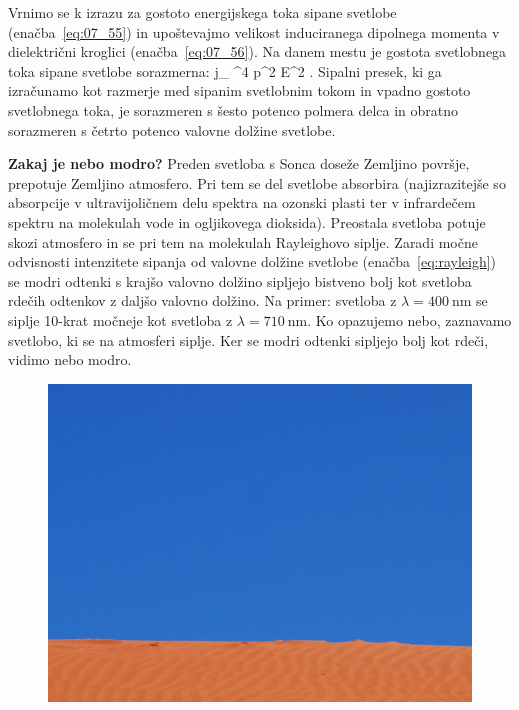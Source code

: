 Vrnimo se k izrazu za gostoto energijskega toka sipane 
svetlobe (enačba~\ref{eq:07_55}) in upoštevajmo velikost induciranega 
dipolnega momenta v dielektrični kroglici (enačba~\ref{eq:07_56}). Na danem
mestu je gostota svetlobnega toka sipane svetlobe sorazmerna:
\beq
j_ \propto \omega^4 p^2 \propto E^2 .
\label{eq:07_17}
\eeq
Sipalni presek, ki ga izračunamo kot razmerje med sipanim svetlobnim tokom in 
vpadno gostoto svetlobnega toka, je sorazmeren s šesto potenco polmera 
delca in obratno sorazmeren s četrto potenco valovne dolžine svetlobe.

\begin{example}{\bf Zakaj je nebo modro?}
Preden svetloba s Sonca doseže Zemljino površje, prepotuje Zemljino atmosfero.
Pri tem se del svetlobe absorbira (najizrazitejše so absorpcije v ultravijoličnem delu 
spektra na ozonski plasti ter v infrardečem spektru na molekulah vode in ogljikovega 
dioksida). Preostala svetloba potuje skozi atmosfero in se pri tem na molekulah
Rayleighovo siplje. Zaradi močne odvisnosti intenzitete sipanja od valovne dolžine 
svetlobe (enačba~\ref{eq:rayleigh}) se modri odtenki s krajšo valovno dolžino 
sipljejo bistveno bolj kot svetloba rdečih odtenkov z daljšo valovno dolžino.
Na primer: svetloba z $\lambda = 400~\si{\nm}$ se siplje 10-krat močneje kot 
svetloba z $\lambda = 710~\si{\nm}$. Ko opazujemo nebo, zaznavamo svetlobo, 
ki se na atmosferi siplje. Ker se modri odtenki sipljejo bolj kot rdeči, 
vidimo nebo modro. 
\begin{figure}[!h]
\centering
\includegraphics[width=7truecm]{slike/07_ModroNebo.jpg}\hfill

\end{figure}
\end{example}
